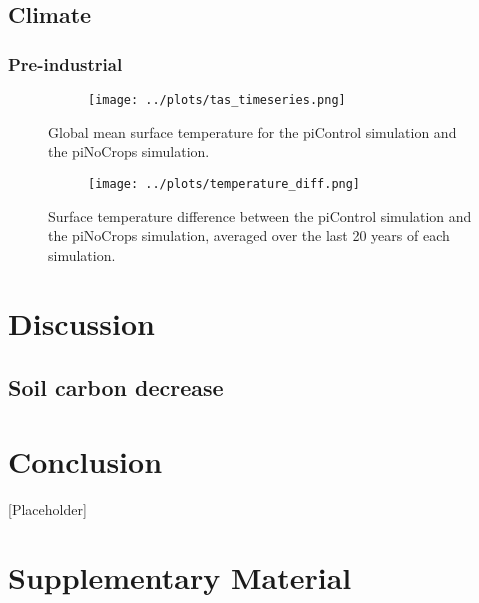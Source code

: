 \documentclass[]{article}
\begin{document}
\subsection{Climate}

\subsubsection{Pre-industrial}

\begin{figure}[H]
    \centering
    \begin{subfigure}[b]{\linewidth}
        \texttt{[image: ../plots/tas\_timeseries.png]}
    \end{subfigure}
    \caption{Global mean surface temperature for the piControl simulation and the piNoCrops simulation.}
    \label{fig:pre-industrial_temperature_tseries}
\end{figure}

\begin{figure}[H]
    \centering
    \begin{subfigure}[b]{\linewidth}
        \texttt{[image: ../plots/temperature\_diff.png]}
    \end{subfigure}
    \caption{Surface temperature difference between the piControl simulation and the piNoCrops simulation, averaged over the last 20 years of each simulation.}
    \label{fig:pre-industrial_temperature_map}
\end{figure}

\section{Discussion}

\subsection{Soil carbon decrease}

\section{Conclusion}

[Placeholder]

\printbibliography

\section{Supplementary Material}
\setcounter{figure}{0}
\end{document}
